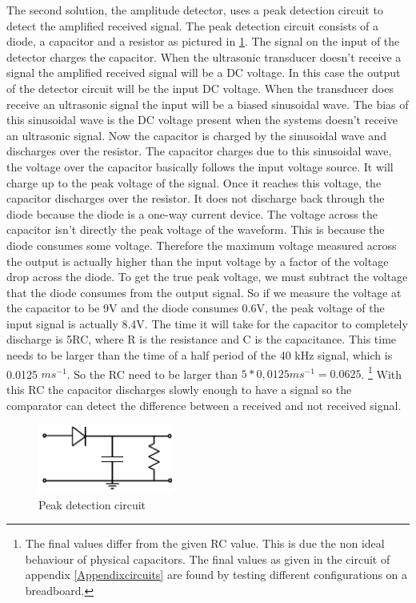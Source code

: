 The second solution, the amplitude detector, uses a peak detection circuit to detect the amplified received signal.
The peak detection circuit consists of a diode, a capacitor and a resistor as pictured in \ref{fig:peak_d}.
The signal on the input of the detector charges the capacitor.
When the ultrasonic transducer doesn't receive a signal the amplified received signal will be a DC voltage.
In this case the output of the detector circuit will be the input DC voltage.
When the transducer does receive an ultrasonic signal the input will be a biased sinusoidal wave.
The bias of this sinusoidal wave is the DC voltage present when the systems doesn't receive an ultrasonic signal.
Now the capacitor is charged by the sinusoidal wave and discharges over the resistor.
The capacitor charges due to this sinusoidal wave, the voltage over the capacitor basically follows the input voltage source. It will charge up to the peak voltage of the signal. Once it reaches this voltage, the capacitor discharges over the resistor.  It does not discharge back through the diode because the diode is a one-way current device. The voltage across the capacitor isn't directly the peak voltage of the waveform. This is because the diode consumes some voltage. Therefore the maximum voltage measured across the output is actually higher than the input voltage by a factor of the voltage drop across the diode. To get the true peak voltage, we must subtract the voltage that the diode consumes from the output signal.
So if we measure the voltage at the capacitor to be 9V and the diode consumes 0.6V, the peak voltage of the input signal is actually 8.4V. The time it will take for the capacitor to completely discharge is 5RC, where R is the resistance and C is the capacitance. This time needs to be larger than the time of a half period of the 40 kHz signal, which is 0.0125 $ms^{-1}$. So the RC need to be larger than $5 * 0,0125 ms^{-1} = 0.0625$. \footnote{The final values differ from the given RC value. This is due the non ideal behaviour of physical capacitors. The final values as given in the circuit of appendix \ref{Appendixcircuits} are found by testing different configurations on a breadboard.} With this RC the capacitor discharges slowly enough to have a signal so the comparator can detect the difference between a received and not received signal.

\begin{figure}[H]
\centering
\includegraphics[width=0.4\textwidth]{Figures/peak_d.PNG}
\caption{Peak detection circuit}
\label{fig:peak_d}
\end{figure}


